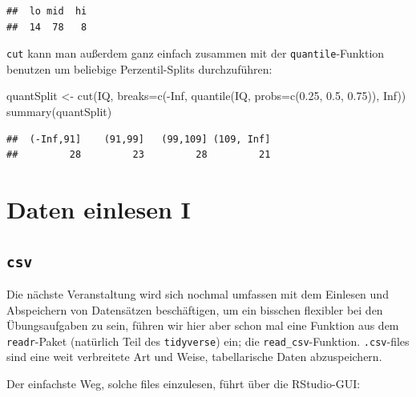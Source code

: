 \documentclass[
]{book}
\newenvironment{Shaded}{\begin{snugshade}}{\end{snugshade}}
\newcommand{\AttributeTok}[1]{\textcolor[rgb]{0.77,0.63,0.00}{#1}}
\newcommand{\ConstantTok}[1]{\textcolor[rgb]{0.00,0.00,0.00}{#1}}
\newcommand{\FloatTok}[1]{\textcolor[rgb]{0.00,0.00,0.81}{#1}}
\newcommand{\FunctionTok}[1]{\textcolor[rgb]{0.00,0.00,0.00}{#1}}
\newcommand{\NormalTok}[1]{#1}
\newcommand{\OtherTok}[1]{\textcolor[rgb]{0.56,0.35,0.01}{#1}}
\newcommand{\SpecialCharTok}[1]{\textcolor[rgb]{0.00,0.00,0.00}{#1}}
\begin{document}
\begin{verbatim}
##  lo mid  hi 
##  14  78   8
\end{verbatim}

\texttt{cut} kann man außerdem ganz einfach zusammen mit der \texttt{quantile}-Funktion benutzen um beliebige Perzentil-Splits durchzuführen:

\begin{Shaded}
\begin{Highlighting}[]
\NormalTok{quantSplit }\OtherTok{\textless{}{-}} \FunctionTok{cut}\NormalTok{(IQ,}
                  \AttributeTok{breaks=}\FunctionTok{c}\NormalTok{(}\SpecialCharTok{{-}}\ConstantTok{Inf}\NormalTok{, }
                           \FunctionTok{quantile}\NormalTok{(IQ, }
                                    \AttributeTok{probs=}\FunctionTok{c}\NormalTok{(}\FloatTok{0.25}\NormalTok{,}
                                            \FloatTok{0.5}\NormalTok{, }
                                            \FloatTok{0.75}\NormalTok{)), }
                           \ConstantTok{Inf}\NormalTok{))}
\FunctionTok{summary}\NormalTok{(quantSplit)}
\end{Highlighting}
\end{Shaded}

\begin{verbatim}
##  (-Inf,91]    (91,99]   (99,109] (109, Inf] 
##         28         23         28         21
\end{verbatim}

\hypertarget{daten-einlesen-i}{%
\section{Daten einlesen I}\label{daten-einlesen-i}}

\hypertarget{csv}{%
\subsection{\texorpdfstring{\texttt{csv}}{csv}}\label{csv}}

Die nächste Veranstaltung wird sich nochmal umfassen mit dem Einlesen und Abspeichern von Datensätzen beschäftigen, um ein bisschen flexibler bei den Übungsaufgaben zu sein, führen wir hier aber schon mal eine Funktion aus dem \texttt{readr}-Paket (natürlich Teil des \texttt{tidyverse}) ein; die \texttt{read\_csv}-Funktion. \texttt{.csv}-files sind eine weit verbreitete Art und Weise, tabellarische Daten abzuspeichern.

Der einfachste Weg, solche files einzulesen, führt über die RStudio-GUI:
\end{document}
